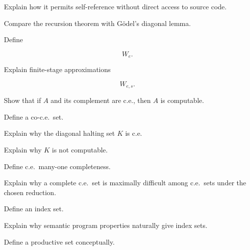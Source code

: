 \begin{exercise}[3]
Explain how it permits self-reference without direct access to source code.
\end{exercise}

\begin{exercise}[3]
Compare the recursion theorem with Gödel's diagonal lemma.
\end{exercise}

\begin{exercise}[2]
Define

\[
W_e.
\]
\end{exercise}

\begin{exercise}[3]
Explain finite-stage approximations

\[
W_{e,s}.
\]
\end{exercise}

\begin{exercise}[3]
Show that if \(A\) and its complement are c.e., then \(A\) is computable.
\end{exercise}

\begin{exercise}[2]
Define a co-c.e.\ set.
\end{exercise}

\begin{exercise}[3]
Explain why the diagonal halting set \(K\) is c.e.
\end{exercise}

\begin{exercise}[3]
Explain why \(K\) is not computable.
\end{exercise}

\begin{exercise}[3]
Define c.e.\ many-one completeness.
\end{exercise}

\begin{exercise}[3]
Explain why a complete c.e.\ set is maximally difficult among c.e.\ sets
under the chosen reduction.
\end{exercise}

\begin{exercise}[3]
Define an index set.
\end{exercise}

\begin{exercise}[3]
Explain why semantic program properties naturally give index sets.
\end{exercise}

\begin{exercise}[3]
Define a productive set conceptually.
\end{exercise}

